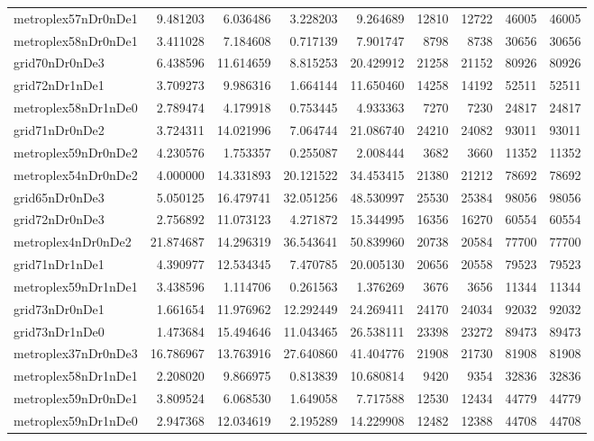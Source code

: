 \begin{longtable}{|l|r|r|r|r|r|r|r|r|}
metroplex57nDr0nDe1 & 9.481203 & 6.036486 & 3.228203 & 9.264689 & 12810 & 12722 & 46005 & 46005 \\
metroplex58nDr0nDe1 & 3.411028 & 7.184608 & 0.717139 & 7.901747 & 8798 & 8738 & 30656 & 30656 \\
grid70nDr0nDe3 & 6.438596 & 11.614659 & 8.815253 & 20.429912 & 21258 & 21152 & 80926 & 80926 \\
grid72nDr1nDe1 & 3.709273 & 9.986316 & 1.664144 & 11.650460 & 14258 & 14192 & 52511 & 52511 \\
metroplex58nDr1nDe0 & 2.789474 & 4.179918 & 0.753445 & 4.933363 & 7270 & 7230 & 24817 & 24817 \\
grid71nDr0nDe2 & 3.724311 & 14.021996 & 7.064744 & 21.086740 & 24210 & 24082 & 93011 & 93011 \\
metroplex59nDr0nDe2 & 4.230576 & 1.753357 & 0.255087 & 2.008444 & 3682 & 3660 & 11352 & 11352 \\
metroplex54nDr0nDe2 & 4.000000 & 14.331893 & 20.121522 & 34.453415 & 21380 & 21212 & 78692 & 78692 \\
grid65nDr0nDe3 & 5.050125 & 16.479741 & 32.051256 & 48.530997 & 25530 & 25384 & 98056 & 98056 \\
grid72nDr0nDe3 & 2.756892 & 11.073123 & 4.271872 & 15.344995 & 16356 & 16270 & 60554 & 60554 \\
metroplex4nDr0nDe2 & 21.874687 & 14.296319 & 36.543641 & 50.839960 & 20738 & 20584 & 77700 & 77700 \\
grid71nDr1nDe1 & 4.390977 & 12.534345 & 7.470785 & 20.005130 & 20656 & 20558 & 79523 & 79523 \\
metroplex59nDr1nDe1 & 3.438596 & 1.114706 & 0.261563 & 1.376269 & 3676 & 3656 & 11344 & 11344 \\
grid73nDr0nDe1 & 1.661654 & 11.976962 & 12.292449 & 24.269411 & 24170 & 24034 & 92032 & 92032 \\
grid73nDr1nDe0 & 1.473684 & 15.494646 & 11.043465 & 26.538111 & 23398 & 23272 & 89473 & 89473 \\
metroplex37nDr0nDe3 & 16.786967 & 13.763916 & 27.640860 & 41.404776 & 21908 & 21730 & 81908 & 81908 \\
metroplex58nDr1nDe1 & 2.208020 & 9.866975 & 0.813839 & 10.680814 & 9420 & 9354 & 32836 & 32836 \\
metroplex59nDr0nDe1 & 3.809524 & 6.068530 & 1.649058 & 7.717588 & 12530 & 12434 & 44779 & 44779 \\
metroplex59nDr1nDe0 & 2.947368 & 12.034619 & 2.195289 & 14.229908 & 12482 & 12388 & 44708 & 44708 \\

\end{longtable}
